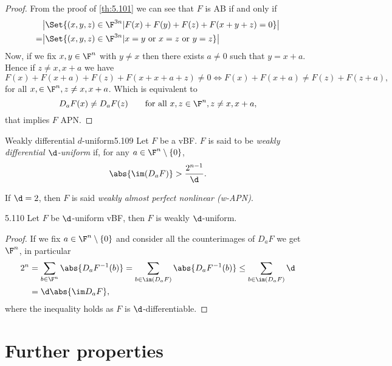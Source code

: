 \begin{proof}
	From the proof of \autoref{th:5.101} we can see that \(F\) is AB if and only if
	\begin{align*}
		  & \big\lvert\Set{(x,y,z) \in \F^{3n} | F(x)+F(y)+F(z)+F(x+y+z) = 0}\big\rvert        \\
		= & \big\lvert\Set{(x,y,z)\in\F^{3n} | x = y \text{ or }x=z \text{ or }y=z}\big\rvert
	\end{align*}
	Now, if we fix \(x,y\in\F^n\) with \(y\neq x\) then there exists \(a\neq 0\) such that \(y=x+a\). Hence if \(z\neq x,x+a\) we have
	\[
		F(x)+F(x+a)+F(z)+F(x+x+a+z) \neq 0 \iff F(x)+F(x+a) \neq F(z)+F(z+a),
	\]
	for all \(x,\in\F^n,z\neq x,x+a\). Which is equivalent to
	\[
		D_a F(x) \neq D_aF(z) \qquad\text{for all }x,z\in\F^n, z\neq x,x+a,
	\]
	that implies \(F\) APN.
\end{proof}

\begin{defn}{Weakly differential \(d\)-uniform}{5.109}
	Let \(F\) be a vBF. \(F\) is said to be \emph{weakly differential \(\d\)-uniform} if, for any \(a\in \F^n\setminus\{0\}\),
	\[
		\abs{\im(D_a F)} > \frac{2^{n-1}}{\d}.
	\]
\end{defn}

\begin{notz}
	If \(\d=2\), then \(F\) is said \emph{weakly almost perfect nonlinear (w-APN)}.
\end{notz}

\begin{prop}{}{5.110}
	Let \(F\) be \(\d\)-uniform vBF, then \(F\) is weakly \(\d\)-uniform.
\end{prop}

\begin{proof}
	If we fix \(a\in\F^n\setminus\{0\}\) and consider all the counterimages of \(D_a F\) we get \(\F^n\), in particular
	\begin{align*}
		2^n & = \sum_{b\in\F^n}\abs{D_a F^{-1}(b)} = \sum_{b\in\im(D_aF)}\abs{D_aF^{-1}(b)} \le \sum_{b\in\im(D_a F)}\d \\
		    & = \d\abs{\im D_a F},
	\end{align*}
	where the inequality holds as \(F\) is \(\d\)-differentiable.
\end{proof}
%
%
\section{Further properties}

